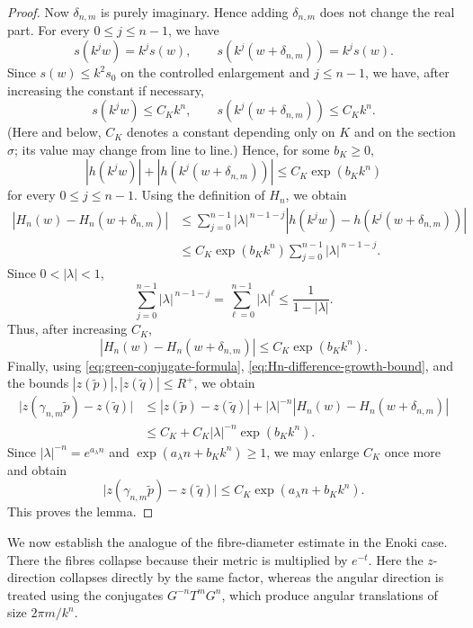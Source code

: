 \documentclass[12pt]{amsart}
\numberwithin{equation}{section}
\theoremstyle{remark}
\theoremstyle{definition}
\begin{document}
\begin{proof}
Now $\delta_{n,m}$ is purely imaginary. Hence adding
$\delta_{n,m}$ does not change the real part. For every
$0\leq j\leq n-1$, we have
\begin{equation*}
s(k^jw)=k^js(w),
\qquad
s(k^j(w+\delta_{n,m}))=k^js(w).
\end{equation*}
Since $s(w)\leq k^2s_0$ on the controlled enlargement and $j\leq n-1$, we
have, after increasing the constant if necessary,
$$
s(k^jw)\leq C_K k^n,
\qquad
s(k^j(w+\delta_{n,m}))\leq C_K k^n.
$$
 (Here and below, $C_K$ denotes a constant depending only on $K$
and on the section $\sigma$; its value may change from line to line.)
Hence, for some $b_K\geq0$,
\begin{equation}
\label{eq:h-growth-green-halfstrip}
|h(k^jw)|+
|h(k^j(w+\delta_{n,m}))|
\leq
C_K\exp(b_Kk^n)
\end{equation}
for every $0\leq j\leq n-1$. 
Using the definition of $H_n$, we obtain
\begin{align*}
\left|
H_n(w)-H_n(w+\delta_{n,m})
\right|
&\leq
\sum_{j=0}^{n-1}
|\lambda|^{\,n-1-j}
\left|
h(k^jw)-h(k^j(w+\delta_{n,m}))
\right| \\
&\leq
C_K\exp(b_Kk^n)
\sum_{j=0}^{n-1}
|\lambda|^{\,n-1-j}.
\end{align*}
Since $0<|\lambda|<1$,
\begin{equation*}
\sum_{j=0}^{n-1}
|\lambda|^{\,n-1-j}
=
\sum_{\ell=0}^{n-1}|\lambda|^\ell
\leq
\frac{1}{1-|\lambda|}.
\end{equation*}
Thus, after increasing $C_K$,
\begin{equation}
\label{eq:Hn-difference-growth-bound}
\left|
H_n(w)-H_n(w+\delta_{n,m})
\right|
\leq
C_K\exp(b_Kk^n).
\end{equation} 
Finally, using \eqref{eq:green-conjugate-formula},
\eqref{eq:Hn-difference-growth-bound}, and the bounds $|z(\tilde p)|,|z(\tilde q)|\leq R^+$, we obtain
\begin{align*}
\bigl|
z(\gamma_{n,m}\tilde p)-z(\tilde q)
\bigr|
&\leq
|z(\tilde p)-z(\tilde q)|
+
|\lambda|^{-n}
\left|
H_n(w)-H_n(w+\delta_{n,m})
\right| \\
&\leq
C_K+C_K|\lambda|^{-n}\exp(b_Kk^n).
\end{align*}
Since $|\lambda|^{-n}=e^{a_\lambda n}$ and $\exp(a_\lambda n+b_Kk^n)\geq1$, we may enlarge $C_K$ once more and obtain
$$
\bigl|
z(\gamma_{n,m}\tilde p)-z(\tilde q)
\bigr|
\leq
C_K\exp(a_\lambda n+b_Kk^n).
$$
This proves the lemma.
\end{proof}

We now establish the analogue of the fibre-diameter estimate in the Enoki case. There the fibres collapse because their metric is multiplied by $e^{-t}$. Here the $z$-direction collapses directly by the same factor, whereas the angular direction is treated using the conjugates $G^{-n}T^mG^n$, which produce angular translations of size $2\pi m/k^n$.
\end{document}
